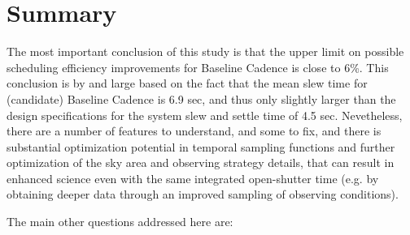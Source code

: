 
\section{Summary}
\def\secname{cadexp:summary}\label{sec:\secname}

The most important conclusion of this study is that the upper limit on
possible scheduling efficiency improvements for Baseline Cadence is
close to 6\%. This conclusion is by and large based on the fact that
the mean slew time for (candidate) Baseline Cadence is 6.9 sec, and
thus only slightly larger than the design specifications for the
system slew and settle time of 4.5 sec.  Nevetheless, there are a
number of features to understand, and some to fix, and there is
substantial optimization potential in temporal sampling functions and
further optimization of the sky area and observing strategy details,
that can result in enhanced science even with the same integrated
open-shutter time (e.g. by obtaining deeper data through an improved
sampling of observing conditions).

\vskip 0.2in
The main other questions addressed here are:

